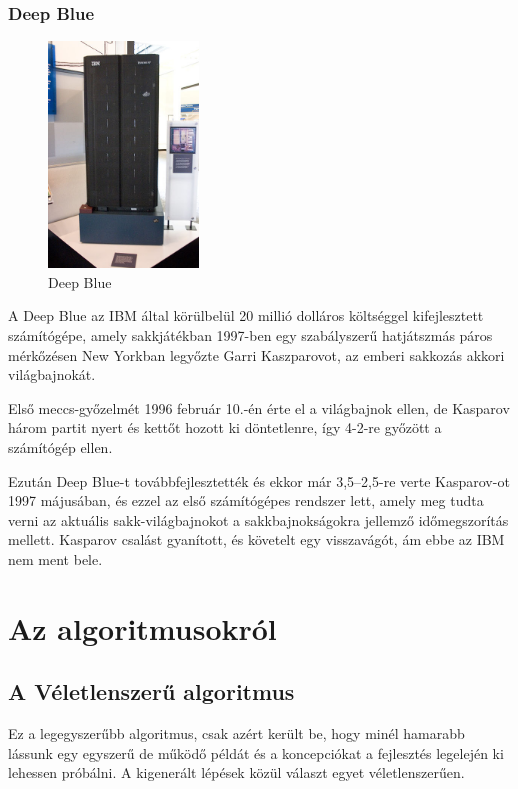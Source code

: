 \documentclass[twoside, a4paper, 12pt]{article}
\begin{document}
\subsubsection{Deep Blue}
\begin{figure}
	\caption{Deep Blue}
	\label{fig:deepblue}
	\includegraphics[width=4.0cm]{img/deepblue.jpg}
\end{figure}
A Deep Blue az IBM által körülbelül 20 millió dolláros költséggel kifejlesztett számítógépe, amely sakkjátékban 1997-ben egy szabályszerű hatjátszmás páros mérkőzésen New Yorkban legyőzte Garri Kaszparovot, az emberi sakkozás akkori világbajnokát.

Első meccs-győzelmét 1996 február 10.-én érte el a világbajnok ellen, de Kasparov három partit nyert és kettőt hozott ki döntetlenre, így 4-2-re győzött a számítógép ellen.

Ezután Deep Blue-t továbbfejlesztették és ekkor már 3,5–2,5-re verte Kasparov-ot 1997 májusában, és ezzel az első számítógépes rendszer lett, amely meg tudta verni az aktuális sakk-világbajnokot a sakkbajnokságokra jellemző időmegszorítás mellett. Kasparov csalást gyanított, és követelt egy visszavágót, ám ebbe az IBM nem ment bele. \cite{DeepBlueHu}\cite{DeepBlueEn}

\section{Az algoritmusokról}

\subsection{A Véletlenszerű algoritmus}
Ez a legegyszerűbb algoritmus, csak azért került be, hogy minél hamarabb lássunk egy egyszerű de működő példát és a koncepciókat a fejlesztés legelején ki lehessen próbálni.
A kigenerált lépések közül választ egyet véletlenszerűen.
\end{document}
